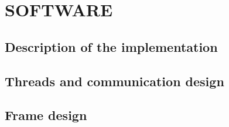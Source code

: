\section{SOFTWARE}

\subsection{Description of the implementation}
\clearpage
\subsection{Threads and communication design} %
\clearpage
\subsection{Frame design}
